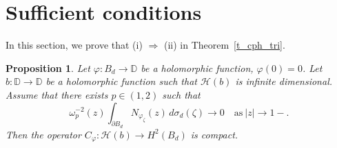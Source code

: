\documentclass{amsart}
\numberwithin{equation}{section}
\newtheorem{proposition}[theorem]{Proposition}
\theoremstyle{definition}
\newcommand{\bd}{{B_d}}
\newcommand{\meal}{\sigma_d}
\newcommand{\dbr}{\mathcal{H}}
\newcommand{\za}{\zeta}
\newcommand{\ph}{\varphi}
\newcommand{\cph}{C_\varphi}
\newcommand{\om}{\omega}
\newcommand{\Dbb}{\mathbb D}
\newcommand{\spd}{\partial B_d}
\begin{document}
\section{Sufficient conditions}\label{s_suff}


In this section, we prove that (i) $\Rightarrow$ (ii) in Theorem~\ref{t_cph_tri}.

\begin{proposition}\label{p_suff}
Let $\ph: \bd \to \Dbb$ be a holomorphic function, $\ph(0)=0$.
Let $b:\Dbb \to \Dbb$ be a holomorphic function such that $\dbr(b)$ is infinite dimensional.
Assume that there exists $p\in (1,2)$ such that
\begin{equation}\label{e_om2Neva0}
\om_p^{-2}(z) \int_{\spd} N_{\ph_\za} (z)\, d\meal(\za) \to 0\quad \textrm{as}\ |z|\to 1-.
\end{equation}
Then the operator $\cph: \dbr(b) \to H^2(\bd)$ is compact.
\end{proposition}
\end{document}
